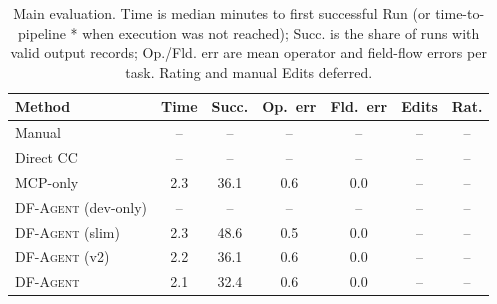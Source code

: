 \begin{table}[t]
\centering
\small
\setlength{\tabcolsep}{3pt}
\begin{tabular}{lcccccc}
\toprule
Method & Time & Succ. & Op.\ err & Fld.\ err & Edits & Rat. \\
\midrule
Manual & -- & -- & -- & -- & -- & -- \\
Direct CC & -- & -- & -- & -- & -- & -- \\
MCP-only & 2.3 & 36.1 & 0.6 & 0.0 & -- & -- \\
\textsc{DF-Agent} (dev-only) & -- & -- & -- & -- & -- & -- \\
\textsc{DF-Agent} (slim) & 2.3 & 48.6 & 0.5 & 0.0 & -- & -- \\
\textsc{DF-Agent} (v2) & 2.2 & 36.1 & 0.6 & 0.0 & -- & -- \\
\textsc{DF-Agent} & 2.1 & 32.4 & 0.6 & 0.0 & -- & -- \\
\bottomrule
\end{tabular}
\caption{Main evaluation. Time is median minutes to first successful Run (or time-to-pipeline * when execution was not reached); Succ. is the share of runs with valid output records; Op./Fld. err are mean operator and field-flow errors per task. Rating and manual Edits deferred.}
\label{tab:eval}
\end{table}
